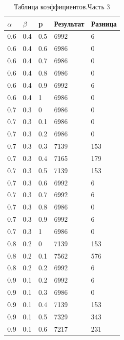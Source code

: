 \documentclass[12pt,a4paper]{report}
\begin{document}
\begin{table}[ht!]
	\centering
	\caption{Таблица коэффициентов.Часть 3}
	\label{table:ref3}
	\begin{tabular}{ | l | l | l | l | l |}
		\hline
		$\alpha$ & $\beta$ & p   & Результат & Разница \\
		\hline
		
		0.6      & 0.4     & 0.5 & 6992      & 6       \\
		0.6      & 0.4     & 0.6 & 6986      & 0       \\
		0.6      & 0.4     & 0.7 & 6986      & 0       \\
		0.6      & 0.4     & 0.8 & 6986      & 0       \\
		0.6      & 0.4     & 0.9 & 6992      & 6       \\
		0.6      & 0.4     & 1   & 6986      & 0       \\
		0.7      & 0.3     & 0   & 6986      & 0       \\
		0.7      & 0.3     & 0.1 & 6986      & 0       \\
		0.7      & 0.3     & 0.2 & 6986      & 0       \\
		0.7      & 0.3     & 0.3 & 7139      & 153     \\
		0.7      & 0.3     & 0.4 & 7165      & 179     \\
		0.7      & 0.3     & 0.5 & 7139      & 153     \\
		0.7      & 0.3     & 0.6 & 6992      & 6       \\
		0.7      & 0.3     & 0.7 & 6992      & 6       \\
		0.7      & 0.3     & 0.8 & 6986      & 0       \\
		0.7      & 0.3     & 0.9 & 6992      & 6       \\
		0.7      & 0.3     & 1   & 6986      & 0       \\
		0.8      & 0.2     & 0   & 7139      & 153     \\
		0.8      & 0.2     & 0.1 & 7562      & 576     \\
		0.8      & 0.2     & 0.2 & 6992      & 6       \\
		0.9      & 0.1     & 0.2 & 6992      & 6       \\
		0.9      & 0.1     & 0.3 & 6986      & 0       \\
		0.9      & 0.1     & 0.4 & 7139      & 153     \\
		0.9      & 0.1     & 0.5 & 7329      & 343     \\
		0.9      & 0.1     & 0.6 & 7217      & 231     \\

\end{tabular}
\end{table}
\end{document}
